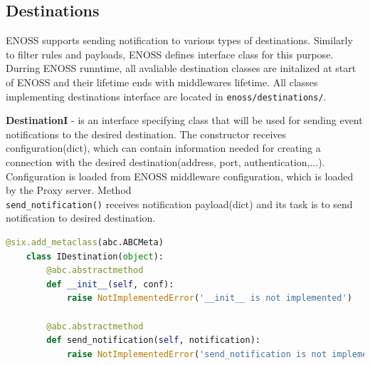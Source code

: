     \subsection{Destinations}
    ENOSS supports sending notification to various types of destinations. Similarly to filter rules and payloads, ENOSS defines interface class for this purpose. Durring ENOSS runntime, all avaliable destination classes are initalized at start of ENOSS and their lifetime ends with middlewares lifetime. All classes implementing destinations interface are located in \texttt{enoss/destinations/}.

    \textbf{DestinationI} - is an interface specifying class that will be used for sending event notifications to the desired destination. The constructor receives configuration(dict), which can contain information needed for creating a connection with the desired destination(address, port, authentication,...). Configuration is loaded from ENOSS middleware configuration, which is loaded by the Proxy server. Method \\\texttt{send\_notification()} receives notification payload(dict) and its task is to send notification to desired destination.

    \begin{lstlisting}[language=Python, style=pythonStyle, caption=Interface of class used for sending notification message to desired destination, label=lst:enoss-destinationi]
    @six.add_metaclass(abc.ABCMeta)
    class IDestination(object):
        @abc.abstractmethod
        def __init__(self, conf):
            raise NotImplementedError('__init__ is not implemented')

        @abc.abstractmethod
        def send_notification(self, notification):
            raise NotImplementedError('send_notification is not implemented')
    \end{lstlisting}

